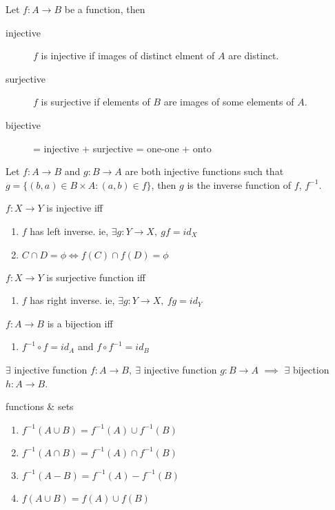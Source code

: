 	\begin{definition} Let $f : A \to B$ be a function, then 
		\begin{description}
			\item[injective] $f$ is injective if images of distinct elment of $A$ are distinct.
			\item[surjective] $f$ is surjective if elements of $B$ are images of some elements of $A$.
			\item[bijective] = injective + surjective = one-one + onto
		\end{description}
	\end{definition}
	\begin{definition}
		Let $f : A \to B$ and $g : B \to A$ are both injective functions such that $g = \{ (b,a) \in B \times A : (a,b) \in f \}$, then $g$ is the inverse function of $f$, $f^{-1}$.
	\end{definition}
	\begin{remark}
		$f : X \to Y$ is injective iff
		\begin{enumerate}
			\item $f$ has left inverse. ie, $\exists g:Y\to X,\ gf = id_X$
			\item $C \cap D = \phi \iff f(C) \cap f(D) = \phi$
		\end{enumerate}
		$f : X \to Y$ is surjective function iff
		\begin{enumerate}
			\item $f$ has right inverse. ie, $\exists g:Y\to X,\ fg = id_Y$
		\end{enumerate}
		$f:A \to B$ is a bijection iff 
		\begin{enumerate}
			\item $f^{-1}\circ f = id_A$ and $f\circ f^{-1} = id_B$
		\end{enumerate}
	\end{remark}
	\begin{theorem}
		$\exists$ injective function $f:A \to B,\ \exists$ injective function $g:B \to A$ $\implies$ $\exists$ bijection $h:A \to B$.
	\end{theorem}
	\begin{remark} functions \& sets
		\begin{enumerate}
		 \item $f^{-1}(A\cup B) = f^{-1}(A) \cup f^{-1}(B)$
		 \item $f^{-1}(A\cap B) = f^{-1}(A) \cap f^{-1}(B)$
		 \item $f^{-1}(A-B) = f^{-1}(A)-f^{-1}(B)$
		 \item $f(A\cup B) = f(A) \cup f(B)$
		\end{enumerate}
	\end{remark}
